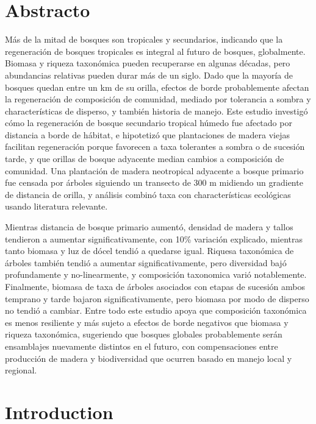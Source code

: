 \documentclass[
  12pt,
]{article}
\begin{document}
\newpage

\hypertarget{abstracto}{%
\section*{Abstracto}\label{abstracto}}

Más de la mitad de bosques son tropicales y secundarios, indicando que la regeneración de bosques tropicales es integral al futuro de bosques, globalmente.
Biomasa y riqueza taxonómica pueden recuperarse en algunas décadas, pero abundancias relativas pueden durar más de un siglo.
Dado que la mayoría de bosques quedan entre un km de su orilla, efectos de borde probablemente afectan la regeneración de composición de comunidad, mediado por tolerancia a sombra y characterísticas de disperso, y también historia de manejo.
Este estudio investigó cómo la regeneración de bosque secundario tropical húmedo fue afectado por distancia a borde de hábitat, e hipotetizó que plantaciones de madera viejas facilitan regeneración porque favorecen a taxa tolerantes a sombra o de sucesión tarde, y que orillas de bosque adyacente median cambios a composición de comunidad.
Una plantación de madera neotropical adyacente a bosque primario fue censada por árboles siguiendo un transecto de 300 m midiendo un gradiente de distancia de orilla, y análisis combinó taxa con characterísticas ecológicas usando literatura relevante.

Mientras distancia de bosque primario aumentó, densidad de madera y tallos tendieron a aumentar significativamente, con 10\% variación explicado, mientras tanto biomasa y luz de dócel tendió a quedarse igual.
Riquesa taxonómica de árboles también tendió a aumentar significativamente, pero diversidad bajó profundamente y no-linearmente, y composición taxonomica varió notablemente.
Finalmente, biomasa de taxa de árboles asociados con etapas de sucesión ambos temprano y tarde bajaron significativamente, pero biomasa por modo de disperso no tendió a cambiar.
Entre todo este estudio apoya que composición taxonómica es menos resiliente y más sujeto a efectos de borde negativos que biomasa y riqueza taxonómica, sugeriendo que bosques globales probablemente serán ensamblajes nuevamente distintos en el futuro, con compensaciones entre producción de madera y biodiversidad que ocurren basado en manejo local y regional.

\newpage

\hypertarget{introduction}{%
\section{Introduction}\label{introduction}}
\end{document}
